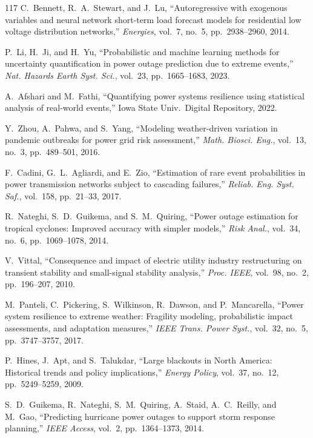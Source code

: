 \documentclass[12pt,a4paper]{article}
\begin{document}
\begin{thebibliography}{117}
 C.~Bennett, R.~A.~Stewart, and J.~Lu, ``Autoregressive with exogenous variables and neural network short-term load forecast models for residential low voltage distribution networks,'' \textit{Energies}, vol.~7, no.~5, pp.~2938--2960, 2014.

 P.~Li, H.~Ji, and H.~Yu, ``Probabilistic and machine learning methods for uncertainty quantification in power outage prediction due to extreme events,'' \textit{Nat. Hazards Earth Syst. Sci.}, vol.~23, pp.~1665--1683, 2023.

 A.~Afshari and M.~Fathi, ``Quantifying power systems resilience using statistical analysis of real-world events,'' Iowa State Univ.\ Digital Repository, 2022.

 Y.~Zhou, A.~Pahwa, and S.~Yang, ``Modeling weather-driven variation in pandemic outbreaks for power grid risk assessment,'' \textit{Math. Biosci. Eng.}, vol.~13, no.~3, pp.~489--501, 2016.

 F.~Cadini, G.~L.~Agliardi, and E.~Zio, ``Estimation of rare event probabilities in power transmission networks subject to cascading failures,'' \textit{Reliab. Eng. Syst. Saf.}, vol.~158, pp.~21--33, 2017.

 R.~Nateghi, S.~D.~Guikema, and S.~M.~Quiring, ``Power outage estimation for tropical cyclones: Improved accuracy with simpler models,'' \textit{Risk Anal.}, vol.~34, no.~6, pp.~1069--1078, 2014.

 V.~Vittal, ``Consequence and impact of electric utility industry restructuring on transient stability and small-signal stability analysis,'' \textit{Proc. IEEE}, vol.~98, no.~2, pp.~196--207, 2010.

 M.~Panteli, C.~Pickering, S.~Wilkinson, R.~Dawson, and P.~Mancarella, ``Power system resilience to extreme weather: Fragility modeling, probabilistic impact assessments, and adaptation measures,'' \textit{IEEE Trans. Power Syst.}, vol.~32, no.~5, pp.~3747--3757, 2017.

 P.~Hines, J.~Apt, and S.~Talukdar, ``Large blackouts in North America: Historical trends and policy implications,'' \textit{Energy Policy}, vol.~37, no.~12, pp.~5249--5259, 2009.

 S.~D.~Guikema, R.~Nateghi, S.~M.~Quiring, A.~Staid, A.~C.~Reilly, and M.~Gao, ``Predicting hurricane power outages to support storm response planning,'' \textit{IEEE Access}, vol.~2, pp.~1364--1373, 2014.


\end{thebibliography}
\end{document}
